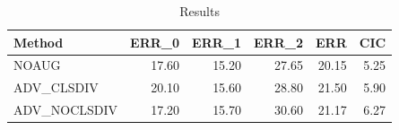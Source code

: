 \begin{table}
\caption{Results}
\label{tab:Results}
\begin{tabular}{lrrrrr}
\toprule
Method & ERR\_0 & ERR\_1 & ERR\_2 & ERR & CIC \\
\midrule
NOAUG & 17.60 & 15.20 & 27.65 & 20.15 & 5.25 \\
ADV\_CLSDIV & 20.10 & 15.60 & 28.80 & 21.50 & 5.90 \\
ADV\_NOCLSDIV & 17.20 & 15.70 & 30.60 & 21.17 & 6.27 \\
\bottomrule
\end{tabular}
\end{table}

